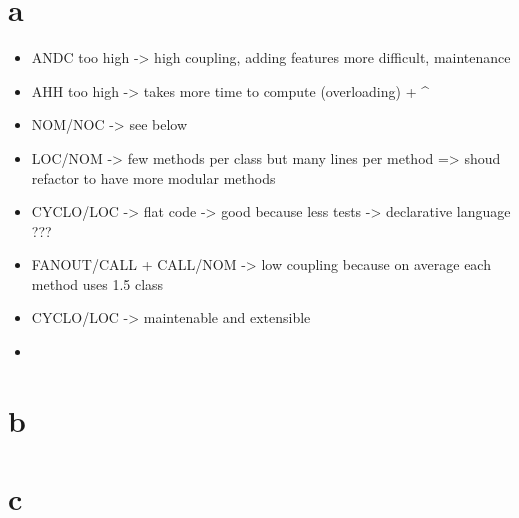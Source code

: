 \section{a}

\begin{itemize}
    \item ANDC too high -> high coupling, adding features more difficult, maintenance
    \item AHH too high -> takes more time to compute (overloading) + ^
    \item NOM/NOC -> see below
    \item LOC/NOM -> few methods per class but many lines per method => shoud refactor to have more modular methods
    \item CYCLO/LOC -> flat code -> good because less tests -> declarative language ???
    \item FANOUT/CALL + CALL/NOM -> low coupling because on average each method uses 1.5 class
\end{itemize}

\begin{itemize}
    \item CYCLO/LOC -> maintenable and extensible
    \item 
\end{itemize}

\section{b}

\section{c}